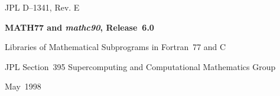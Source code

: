 \documentclass[twoside]{MATH77}
\begin{document}
\begcover
\begin{center}
\begin{minipage}{5.5in}
JPL D--1341, Rev. E

\vspace{1.5in}

{\huge \bf MATH77 and {\em mathc90}, Release~6.0}

\vspace{.75in}
{\LARGE Libraries of Mathematical Subprograms in\newline
Fortran~77 and C}

\vspace{.75in}
{\Large JPL Section~395 Supercomputing and\newline
Computational Mathematics Group}\newline

\vspace{1in}

\vspace{20pt}

\vspace{1in}

{\Large May~1998}
\end{minipage}
\end{center}
\newpage
\end{document}
